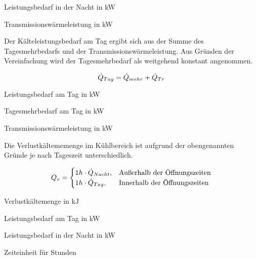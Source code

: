 \begin{description}[\dth]

	\item[$\pnacht$] Leistungsbedarf in der Nacht in kW
	\item[$\ptrans$] Transmissionswärmeleistung in kW

\end{description}
\vspace{0.5cm}


Der K\"alteleistungsbedarf am Tag ergibt sich aus der Summe des Tagesmehrbedarfs
und der Transmissionswärmeleistung. Aus Gründen der Vereinfachung wird der
Tagesmehrbedarf als weitgehend konstant angenommen.

\begin{equation}
	\ptag = \pmehr + \ptrans
\label{ptag}
\end{equation}

\begin{description}[\dth]

	\item[$\ptag$] Leistungsbedarf am Tag in kW
	\item[$\pmehr$] Tagesmehrbedarf am Tag in kW
	\item[$\ptrans$] Transmissionswärmeleistung in kW

\end{description}
\vspace{0.5cm}

Die Verlustk\"altememenge im K\"uhlbereich ist aufgrund der obengenannten
Gr\"unde je nach Tageszeit unterschiedlich.

\begin{equation}
	Q_v = \begin{cases}
	1h \cdot \pnacht, & \text{Au\ss erhalb der \"Offnungszeiten}\\
	1h \cdot \ptag, & \text{Innerhalb der \"Offnungszeiten}
	\end{cases}
\label{qv}
\end{equation}

\begin{description}[\dth]

	\item[$Q_v$] Verlustk\"altemenge in kJ
	\item[$\ptag$] Leistungsbedarf am Tag in kW
	\item[$\pnacht$] Leistungsbedarf in der Nacht in kW
	\item[$h$] Zeiteinheit f\"ur Stunden

\end{description}
\vspace{0.5cm}


